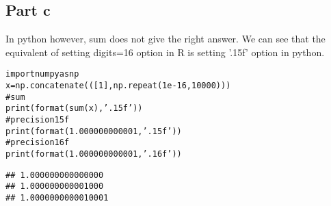 \documentclass{llncs}\usepackage[]{graphicx}\usepackage[]{color}
\makeatletter
\newenvironment{kframe}{%
 \def\at@end@of@kframe{}%
 \ifinner\ifhmode%
  \def\at@end@of@kframe{\end{minipage}}%
  \begin{minipage}{\columnwidth}%
 \fi\fi%
 \def\FrameCommand##1{\hskip\@totalleftmargin \hskip-\fboxsep
 \colorbox{shadecolor}{##1}\hskip-\fboxsep
     \hskip-\linewidth \hskip-\@totalleftmargin \hskip\columnwidth}%
 \MakeFramed {\advance\hsize-\width
   \@totalleftmargin\z@ \linewidth\hsize
   \@setminipage}}%
 {\par\unskip\endMakeFramed%
 \at@end@of@kframe}
\newenvironment{knitrout}{}{} %
\makeatother
\begin{document}
\subsection{Part c}
In python however, sum does not give the right answer. We can see that the equivalent of setting digits=16 option in R is setting '.15f' option in python.
\begin{knitrout}
\color{fgcolor}\begin{kframe}
\begin{alltt}
import numpy as np
x=np.concatenate(([1],np.repeat(1e-16,10000)))
#sum
print(format(sum(x), '.15f')) 
# precision 15f
print(format(1.000000000001, '.15f'))
# precision 16f
print(format(1.000000000001, '.16f'))
\end{alltt}

\begin{lstlisting}[basicstyle=\ttfamily,breaklines=true]
## 1.000000000000000
## 1.000000000001000
## 1.0000000000010001
\end{lstlisting}
\end{kframe}
\end{knitrout}
\end{document}
